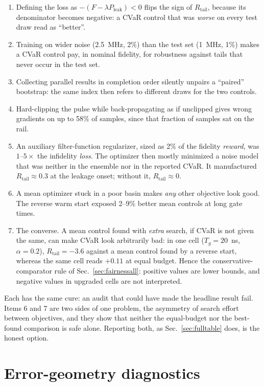 \documentclass[aps,pra,onecolumn,notitlepage,superscriptaddress,nofootinbib,floatfix]{revtex4-2}
\newcommand{\Rt}{R_{\mathrm{tail}}}
\begin{document}
\begin{enumerate}[leftmargin=*,itemsep=1pt]
\item Defining the loss as $-(F-\lambda P_{\mathrm{leak}})<0$ flips the sign
of $\Rt$, because its denominator becomes negative: a CVaR control that was
\emph{worse} on every test draw read as ``better''.
\item Training on wider noise (2.5~MHz, 2\%) than the test set (1~MHz, 1\%)
makes a CVaR control pay, in nominal fidelity, for robustness against tails
that never occur in the test set.
\item Collecting parallel results in completion order silently unpairs a
``paired'' bootstrap: the same index then refers to different draws for the
two controls.
\item Hard-clipping the pulse while back-propagating as if unclipped gives
wrong gradients on up to 58\% of samples, since that fraction of samples sat
on the rail.
\item An auxiliary filter-function regularizer, sized as 2\% of the fidelity
\emph{reward}, was $1$--$5\times$ the infidelity \emph{loss}. The optimizer
then mostly minimized a noise model that was neither in the ensemble nor in
the reported CVaR. It manufactured $\Rt\approx0.3$ at the leakage onset;
without it, $\Rt\approx0$.
\item A mean optimizer stuck in a poor basin makes \emph{any} other objective
look good. The reverse warm start exposed 2--9\% better mean controls at
long gate times.
\item The converse. A mean control found with \emph{extra} search, if CVaR is
not given the same, can make CVaR look arbitrarily bad: in one cell
($T_g=20$~ns, $\alpha=0.2$), $\Rt=-3.6$ against a mean control found by a
reverse start, whereas the same cell reads $+0.11$ at equal budget. Hence the
conservative-comparator rule of Sec.~\ref{sec:fairnessall}: positive values are
lower bounds, and negative values in upgraded cells are not interpreted.
\end{enumerate}
Each has the same cure: an audit that could have made the headline result
fail. Items 6 and 7 are two sides of one problem, the asymmetry of search
effort between objectives, and they show that neither the equal-budget nor
the best-found comparison is safe alone. Reporting both, as
Sec.~\ref{sec:fulltable} does, is the honest option.


\section{Error-geometry diagnostics}
\label{sec:diagnostics}
\end{document}
